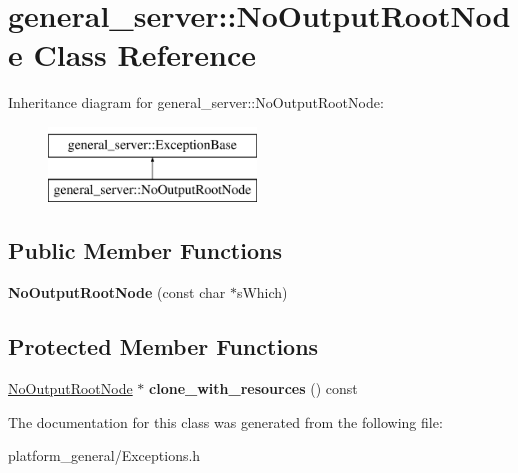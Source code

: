 \hypertarget{classgeneral__server_1_1NoOutputRootNode}{\section{general\-\_\-server\-:\-:\-No\-Output\-Root\-Node \-Class \-Reference}
\label{classgeneral__server_1_1NoOutputRootNode}
}
\-Inheritance diagram for general\-\_\-server\-:\-:\-No\-Output\-Root\-Node\-:\begin{figure}[H]
\begin{center}
\leavevmode
\includegraphics[height=2.000000cm]{classgeneral__server_1_1NoOutputRootNode}
\end{center}
\end{figure}
\subsection*{\-Public \-Member \-Functions}
\begin{DoxyCompactItemize}
\item 
\hypertarget{classgeneral__server_1_1NoOutputRootNode_ad6fbb11db8989f3417001a0d62fb5339}{{\bfseries \-No\-Output\-Root\-Node} (const char $\ast$s\-Which)}\label{classgeneral__server_1_1NoOutputRootNode_ad6fbb11db8989f3417001a0d62fb5339}

\end{DoxyCompactItemize}
\subsection*{\-Protected \-Member \-Functions}
\begin{DoxyCompactItemize}
\item 
\hypertarget{classgeneral__server_1_1NoOutputRootNode_ab978d9e8cfbc78cac1d0beace6b08ad8}{\hyperlink{classgeneral__server_1_1NoOutputRootNode}{\-No\-Output\-Root\-Node} $\ast$ {\bfseries clone\-\_\-with\-\_\-resources} () const }\label{classgeneral__server_1_1NoOutputRootNode_ab978d9e8cfbc78cac1d0beace6b08ad8}

\end{DoxyCompactItemize}


\-The documentation for this class was generated from the following file\-:\begin{DoxyCompactItemize}
\item 
platform\-\_\-general/\-Exceptions.\-h\end{DoxyCompactItemize}
